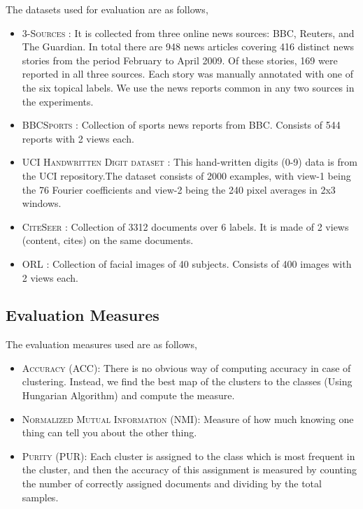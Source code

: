 \documentclass[a4paper]{article}
\begin{document}
	The datasets used for evaluation are as follows,
	\begin{itemize}
	\item \textsc{3-Sources} : It is collected from three online news sources: BBC, Reuters, and The Guardian. In total there are 948 news articles covering 416 distinct news stories from the period February to April 2009. Of these stories, 169 were reported in all three sources. Each story was manually annotated with one of the six topical labels. We use the news reports common in any two sources in the experiments.
	\item \textsc{BBCSports} : Collection of sports news reports from BBC. Consists of 544 reports with 2 views each.
	\item \textsc{UCI Handwritten Digit dataset} : This hand-written digits (0-9) data is from the UCI repository.The dataset consists of 2000 examples, with view-1 being the 76 Fourier coefficients and view-2 being the 240 pixel averages in 2x3 windows.	
	\item \textsc{CiteSeer} : Collection of 3312 documents over 6 labels. It is made of 2 views (content, cites) on the same documents.
	\item \textsc{ORL} : Collection of facial images of 40 subjects. Consists of 400 images with 2 views each.	
	\end{itemize}

	\subsection{Evaluation Measures}

	The evaluation measures used are as follows,
	\begin{itemize}
	\item \textsc{Accuracy (ACC):} There is no obvious way of computing accuracy in case of clustering. Instead, we find the best map of the clusters to the classes (Using Hungarian Algorithm) and compute the measure.
	\item \textsc{Normalized Mutual Information (NMI):} Measure of how much knowing one thing can tell you about the other thing.
	\item \textsc{Purity (PUR):} Each cluster is assigned to the class which is most frequent in the cluster, and then the accuracy of this assignment is measured by counting the number of correctly assigned documents and dividing by the total samples.
	\end{itemize}

	\pagebreak	
\end{document}
